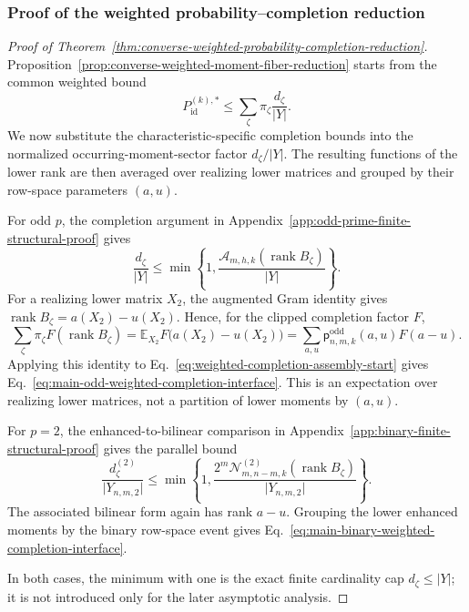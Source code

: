 \documentclass[11pt]{article}
\newcommand{\rank}{\operatorname{rank}}
\newcommand{\1}{\mathbf 1}
\theoremstyle{plain}
\theoremstyle{definition}
\theoremstyle{remark}
\begin{document}
\subsubsection{Proof of the weighted probability--completion reduction}

\begin{proof}[Proof of Theorem~\ref{thm:converse-weighted-probability-completion-reduction}]
Proposition~\ref{prop:converse-weighted-moment-fiber-reduction} starts from the
common weighted bound
\begin{equation}
 P_{\mathrm{id}}^{(k),*}
 \le\sum_\zeta\pi_\zeta\frac{d_\zeta}{\lvert Y\rvert}.
 \label{eq:weighted-completion-assembly-start}
\end{equation}
We now substitute the characteristic-specific completion bounds into the
normalized occurring-moment-sector factor $d_\zeta/\lvert Y\rvert$.  The
resulting functions of the lower rank are then averaged over realizing lower
matrices and grouped by their row-space parameters $(a,u)$.

For odd $p$, the completion argument in
Appendix~\ref{app:odd-prime-finite-structural-proof} gives
\begin{equation}
 \frac{d_\zeta}{\lvert Y\rvert}
 \le\min\left\{1,
 \frac{\mathcal A_{m,h,k}(\rank B_\zeta)}{\lvert Y\rvert}\right\}.
 \label{eq:weighted-completion-assembly-odd-substitution}
\end{equation}
For a realizing lower matrix $X_2$, the augmented Gram identity gives
$\rank B_\zeta=a(X_2)-u(X_2)$.  Hence, for the clipped completion factor $F$,
\begin{equation}
 \sum_\zeta\pi_\zeta F(\rank B_\zeta)
 =\mathbb E_{X_2}F\bigl(a(X_2)-u(X_2)\bigr)
 =\sum_{a,u}\mathsf p_{n,m,k}^{\mathrm{odd}}(a,u)F(a-u).
 \label{eq:main-odd-realization-expectation-regrouping}
\end{equation}
Applying this identity to Eq.~\eqref{eq:weighted-completion-assembly-start}
gives Eq.~\eqref{eq:main-odd-weighted-completion-interface}.  This is an
expectation over realizing lower matrices, not a partition of lower moments by
$(a,u)$.

For $p=2$, the enhanced-to-bilinear comparison in
Appendix~\ref{app:binary-finite-structural-proof} gives the parallel bound
\begin{equation}
 \frac{d_\zeta^{(2)}}{\lvert Y_{n,m,2}\rvert}
 \le\min\left\{1,
 \frac{2^m\mathcal N_{m,n-m,k}^{(2)}(\rank B_\zeta)}
 {\lvert Y_{n,m,2}\rvert}\right\}.
 \label{eq:weighted-completion-assembly-binary-substitution}
\end{equation}
The associated bilinear form again has rank $a-u$.  Grouping the lower
enhanced moments by the binary row-space event gives
Eq.~\eqref{eq:main-binary-weighted-completion-interface}.

In both cases, the minimum with one is the exact finite cardinality cap
$d_\zeta\le\lvert Y\rvert$; it is not introduced only for the later asymptotic analysis.
\end{proof}
\end{document}
